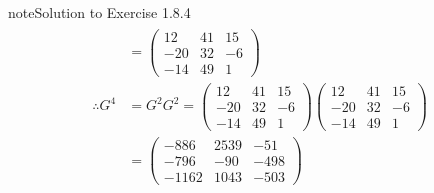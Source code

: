 \documentclass[letterpaper,10pt,english]{jupyterBook}
\begin{document}
\begin{sphinxadmonition}{note}{Solution to Exercise 1.8.4}
\begin{equation*}
\begin{split}
\begin{align*}
    &= \begin{pmatrix} 12 & 41 & 15 \\ -20 & 32 & -6 \\ -14 & 49 & 1 \end{pmatrix} \\
    \therefore G^4 &= G^2G^2 = 
    \begin{pmatrix} 12 & 41 & 15 \\ -20 & 32 & -6 \\ -14 & 49 & 1 \end{pmatrix}
    \begin{pmatrix} 12 & 41 & 15 \\ -20 & 32 & -6 \\ -14 & 49 & 1 \end{pmatrix} \\
    &=
    \begin{pmatrix} -886 & 2539 & -51 \\ -796 & -90 & -498 \\ -1162 & 1043 & -503 \end{pmatrix}
\end{align*} \end{split}
\end{equation*}\end{sphinxadmonition}
 \label{_pages/A1_Matrices_exercises_solutions:_pages/A1_Matrices_exercises_solutions-solution-4}
\end{document}
